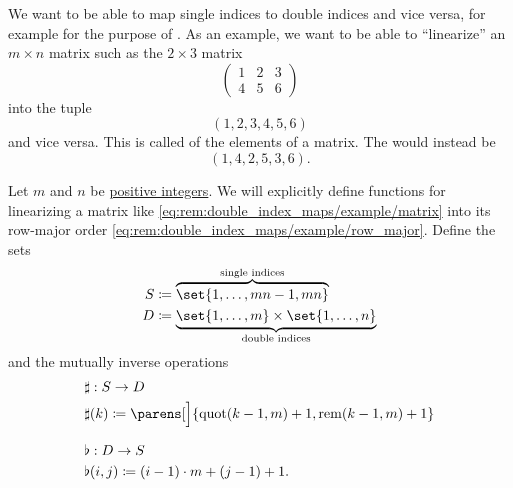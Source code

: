 \begin{remark}\label{rem:double_index_maps}
  We want to be able to map single indices to double indices and vice versa, for example for the purpose of . As an example, we want to be able to \enquote{linearize} an \( m \times n \) matrix such as the \( 2 \times 3 \) matrix
  \begin{equation}\label{eq:rem:double_index_maps/example/matrix}
    \begin{pmatrix}
      1 & 2 & 3 \\
      4 & 5 & 6
    \end{pmatrix}
  \end{equation}
  into the tuple
  \begin{equation}\label{eq:rem:double_index_maps/example/row_major}
    (1, 2, 3, 4, 5, 6)
  \end{equation}
  and vice versa. This is called  of the elements of a matrix. The  would instead be
  \begin{equation}\label{eq:rem:double_index_maps/example/column_major}
    (1, 4, 2, 5, 3, 6).
  \end{equation}

  Let \( m \) and \( n \) be \hyperref[rem:peano_arithmetic_zero/positive]{positive integers}. We will explicitly define functions for linearizing a matrix like \eqref{eq:rem:double_index_maps/example/matrix} into its row-major order \eqref{eq:rem:double_index_maps/example/row_major}. Define the sets
  \begin{align*}
    S &\coloneqq \overbrace{ \set{ 1, \ldots, mn - 1, mn } }^{\T{single indices}}
    \\
    D &\coloneqq \underbrace{ \set{ 1, \ldots, m } \times \set{ 1, \ldots, n } }_{\T{double indices}}
  \end{align*}
  and the mutually inverse operations
  \begin{align}
    &\begin{aligned}\label{eq:rem:double_index_maps/sharp}
      &\sharp: S \to D \\
      &\sharp(k) \coloneqq \parens[\Big]{ \quot(k - 1, m) + 1, \rem(k - 1, m) + 1 } \\
    \end{aligned}
    \\[0.5\baselineskip]
    &\begin{aligned}\label{eq:rem:double_index_maps/flat}
      &\flat: D \to S \\
      &\flat(i, j) \coloneqq (i - 1) \cdot m + (j - 1) + 1.
    \end{aligned}
  \end{align}


\end{remark}
